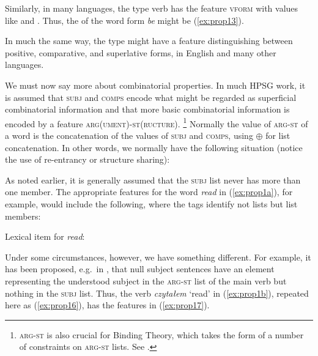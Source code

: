 \documentclass[output=paper
	        ,collection
	        ,collectionchapter
 	        ,biblatex
                ,babelshorthands
                ,newtxmath
                ,draftmode
                ,colorlinks, citecolor=brown
]{langscibook}
\begin{document}
\ea\label{ex:prop12}
\z

\noindent
Similarly, in many languages, the type verb has the feature \textsc{vform} with values like  and . Thus, the  of the word form \emph{be} might be (\ref{ex:prop13}).

\ea\label{ex:prop13}
\z

\noindent
In much the same way, the type  might have a feature distinguishing between positive, comparative, and superlative forms, in English and many other languages.

We must now say more about combinatorial properties. In much HPSG work, it is assumed that \textsc{subj} and \textsc{comps} encode what might be regarded as superficial combinatorial information and that more basic combinatorial information is encoded by a feature \textsc{arg(ument)-st(ructure)}.%
%
\footnote{\textsc{arg-st} is also crucial for Binding Theory, which takes the form of a number of constraints on \textsc{arg-st} lists. See .}
%
Normally the value of \textsc{arg-st} of a word is the concatenation of the values of \textsc{subj} and \textsc{comps}, using $\oplus$ for list concatenation. In other words, we normally have the following situation (notice the use of re-entrancy or structure sharing):

\ea\label{ex:prop14}
\z

\noindent
As noted earlier, it is generally assumed that the \textsc{subj} list never has more than one member. The appropriate features for the word \emph{read} in (\ref{ex:prop1a}), for example, would include the following, where the tags identify not lists but list members:

\eas
\label{ex:prop15}
Lexical item for \emph{read}:\\
\zs

\noindent
Under some circumstances, however, we have something different. For example, it has been proposed, e.g.\ in \citet[65]{MS99a}, that null subject sentences have an element representing the understood subject in the \textsc{arg-st} list of the main verb but nothing in the \textsc{subj} list. Thus, the verb \emph{czytałem} `read' in (\ref{ex:prop1b}), repeated here as (\ref{ex:prop16}), has the features in (\ref{ex:prop17}).
\end{document}
